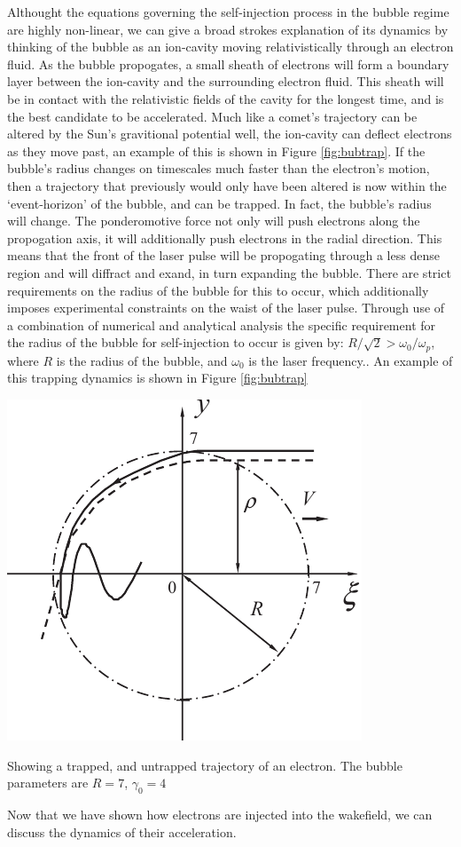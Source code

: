 \documentclass[12pt,letter]{article}
\begin{document}
Althought the equations governing the self-injection process in the bubble
regime are highly non-linear, we can give a broad strokes explanation of its
dynamics by thinking of the bubble as an ion-cavity moving relativistically through an
electron fluid. As the bubble propogates, a small sheath of electrons will form a boundary layer
between the ion-cavity and the surrounding electron fluid. This sheath will be
in contact with the relativistic fields of the cavity for the longest time, and
is the best candidate to be accelerated. Much like a comet's trajectory  can be
altered by the
Sun's gravitional potential well, the ion-cavity can deflect electrons as they
move past, an example of this is shown in Figure \ref{fig:bubtrap}. If the
bubble's radius changes on timescales much faster than the electron's motion,
then a trajectory that previously would only have been altered is now within the
`event-horizon' of the bubble, and can be trapped. In fact, the bubble's radius
will change. The ponderomotive force not only will push electrons along the
propogation axis, it will additionally push electrons in the radial direction.
This means that the front of the laser pulse will be propogating through a less
dense region and will diffract and exand, in turn expanding the bubble.
    There are strict requirements on the radius of the bubble for this to occur,
    which additionally imposes experimental constraints on the waist of the
    laser pulse.
    Through use of a combination of numerical and analytical analysis the specific requirement
    for the radius of the bubble for self-injection to occur is given by: $R/\sqrt{2} >
    \omega_0/\omega_p$, where $R$ is the radius of the bubble, and $\omega_0$ is
    the laser frequency.\cite{PhysRevLett.103.175003}. An example of this
    trapping dynamics is shown in Figure \ref{fig:bubtrap}

    \begin{marginfigure}[-200pt]
        \label{fig:bubtrap}
        \includegraphics[width = \marginparwidth]{../figures/bubbletrap1.pdf}
        \caption{Showing a trapped, and untrapped trajectory of an electron. The
        bubble parameters are $R = 7$, $\gamma_0 = 4$}
\end{marginfigure}
Now that we have shown how electrons are injected into the wakefield, we can
discuss the dynamics of their acceleration.
\end{document}
